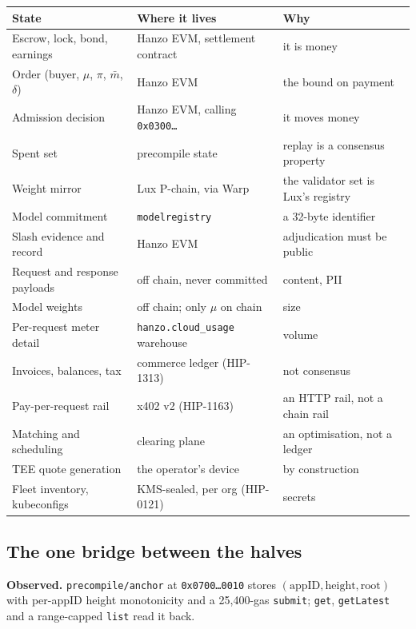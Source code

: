 \documentclass[11pt,a4paper]{article}
\theoremstyle{definition}
\theoremstyle{remark}
\newcommand{\code}[1]{\texttt{#1}}
\begin{document}
\begin{center}
\begin{tabularx}{\textwidth}{@{}lXl@{}}
\toprule
State & Where it lives & Why \\
\midrule
Escrow, lock, bond, earnings & Hanzo EVM, settlement contract & it is money \\
Order (buyer, $\mu$, $\pi$, $\bar m$, $\delta$) & Hanzo EVM & the bound on payment \\
Admission decision & Hanzo EVM, calling \code{0x0300\ldots} & it moves money \\
Spent set & precompile state & replay is a consensus property \\
Weight mirror & Lux P-chain, via Warp & the validator set is Lux's registry \\
Model commitment & \code{modelregistry} & a 32-byte identifier \\
Slash evidence and record & Hanzo EVM & adjudication must be public \\
\midrule
Request and response payloads & off chain, never committed & content, PII \\
Model weights & off chain; only $\mu$ on chain & size \\
Per-request meter detail & \code{hanzo.cloud\_usage} warehouse & volume \\
Invoices, balances, tax & commerce ledger (HIP-1313) & not consensus \\
Pay-per-request rail & x402 v2 (HIP-1163) & an HTTP rail, not a chain rail \\
Matching and scheduling & clearing plane & an optimisation, not a ledger \\
TEE quote generation & the operator's device & by construction \\
Fleet inventory, kubeconfigs & KMS-sealed, per org (HIP-0121) & secrets \\
\bottomrule
\end{tabularx}
\end{center}

\subsection{The one bridge between the halves}

\textbf{Observed.} \code{precompile/anchor} at \code{0x0700\ldots0010} stores
$(\text{appID}, \text{height}, \text{root})$ with per-appID height monotonicity
and a 25{,}400-gas \code{submit}; \code{get}, \code{getLatest} and a
range-capped \code{list} read it back.
\end{document}
